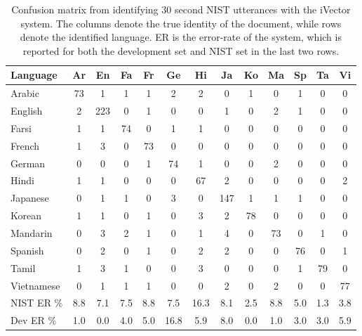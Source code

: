 \begin{table}[hbt!]
\begin{tabular}{| l | c | c | c | c | c | c | c | c | c | c | c | c |}
\hline
Language &Ar & En & Fa & Fr & Ge & Hi & Ja & Ko & Ma & Sp & Ta & Vi \\
\hline
Arabic       & 73 & 1 & 1 & 1 & 2 & 2 & 0 & 1 & 0 & 1 & 0 & 0 \\
English      & 2 & 223 & 0 & 1 & 0 & 0 & 1 & 0 & 2 & 1 & 0 & 0\\
Farsi          & 1 & 1 & 74 & 0 & 1 & 1 & 0 & 0 & 0 & 0 & 0 & 0\\
French       & 1 & 3 & 0 & 73 & 0 & 0 & 0 & 0 & 0 & 0 & 0 & 0\\
German     & 0 & 0 & 0 & 1 & 74 & 1 & 0 & 0 & 2 & 0 & 0 & 0\\
Hindi          & 1 & 1 & 0 & 0 & 0 & 67 & 2 & 0 & 0 & 0 & 0 & 2\\
Japanese   & 0 & 1 & 1 & 0 & 3 & 0 & 147 & 1 & 1 & 1 & 0 & 0\\
Korean       & 1 & 1 & 0 & 1 & 0 & 3 & 2 & 78 & 0 & 0 & 0 & 0\\
Mandarin    & 0 & 3 & 2 & 1 & 0 & 1 & 4 & 0 & 73 & 0 & 1 & 0\\
Spanish       & 0 & 2 & 0 & 1 & 0 & 2 & 2 & 0 & 0 & 76 & 0 & 1\\
Tamil           & 1 & 3 & 1 & 0 & 0 & 3 & 0 & 0 & 0 & 1 & 79 & 0\\
Vietnamese & 0 & 1 & 1 & 1 & 0 & 0 & 2 & 0 & 2 & 0 & 0 & 77\\
\hline
NIST ER \%& 8.8 & 7.1 & 7.5 & 8.8 &  7.5 & 16.3 & 8.1 & 2.5 & 8.8 & 5.0 & 1.3 & 3.8 \\
\hline
Dev ER \% & 1.0 & 0.0 & 4.0 & 5.0 & 16.8 &  5.9 & 8.0 & 0.0 & 1.0 & 3.0 & 3.0 & 5.9 \\
\hline
\end{tabular}
\caption{Confusion matrix from identifying 30 second NIST utterances with the iVector system. The columns denote the true identity of the document, while rows denote the identified language. ER is the error-rate of the system, which is reported for both the development set and NIST set in the last two rows.}
\label{ivectidresults}
\end{table}


